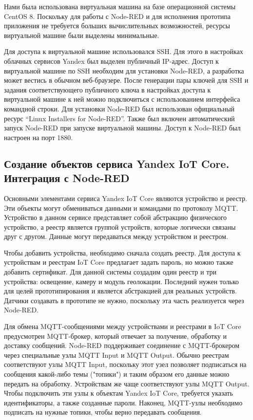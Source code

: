 Нами была использована виртуальная машина на базе операционной системы CentOS 8. Поскольку для работы с Node-RED и для исполнения прототипа приложения не требуется больших вычислительных возможностей, ресурсы виртуальной машине были выделены минимальные.

Для доступа к виртуальной машине использовался SSH. Для этого в настройках облачных сервисов Yandex был выделен публичный IP-адрес. Доступ к виртуальной машине по SSH необходим для установки Node-RED, а разработка может вестись в обычном веб-браузере. После генерации пары ключей для SSH и задания соответствующего публичного ключа в настройках доступа к виртуальной машине к ней можно подключиться с использованием интерфейса командной строки. Для установки Node-RED был использован официальный ресурс ``Linux Installers for Node-RED''. Также был включен автоматический запуск Node-RED при запуске виртуальной машины. Доступ к Node-RED был настроен на порт 1880.

\subsection {Создание объектов сервиса Yandex IoT Core. Интеграция с Node-RED}
Основными элементами сервиса Yandex IoT Core являются устройство и реестр. Эти объекты могут обмениваться данными и командами по протоколу MQTT. Устройство в данном сервисе представляет собой абстракцию физического устройство, а реестр является группой устройств, которые логически связаны друг с другом. Данные могут передаваться между устройством и реестром.

Чтобы добавить устройства, необходимо сначала создать реестр. Для доступа к устройствам и реестрам IoT Core предлагает задать пароль, но можно также добавить сертификат. Для данной системы создадим один реестр и три устройства: освещение, камеру и модуль геолокации. Последний нужен только для целей прототипирования и является абстракцией для реальных устройств. Датчики создавать в прототипе не нужно, поскольку эта часть реализуется через Node-RED.

Для обмена MQTT-сообщениями между устройствами и реестрами в IoT Core предусмотрен MQTT-брокер, который отвечает за получение, обработку и доставку сообщений. Node-RED поддерживает соединение с MQTT-брокером через специальные узлы MQTT Input и MQTT Output. Обычно реестрам соответствуют узлы MQTT Input, поскольку этот узел позволяет подписаться на сообщения какой-либо темы ("топики"{}) и таким образом его данные можно передать на обработку. Устройствам же чаще соответствуют узлы MQTT Output. Чтобы подключить эти узлы к объектам Yandex IoT Core, требуется указать идентификаторы, а также созданные пароли. Наконец, MQTT-узлы необходимо подписать на нужные топики, чтобы верно передавать сообщения.

